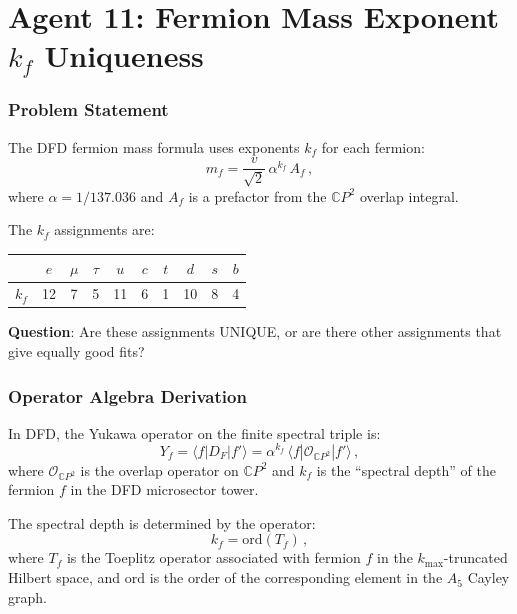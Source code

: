 \documentclass[11pt,a4paper]{article}
\newcommand{\CP}{\mathbb{C}P}
\begin{document}
\part{Agent 11: Fermion Mass Exponent $k_f$ Uniqueness}
\label{part:kf-uniqueness}

\section{Problem Statement}

The DFD fermion mass formula uses exponents $k_f$ for each fermion:
\begin{equation}
m_f = \frac{v}{\sqrt{2}}\,\alpha^{k_f}\,A_f\,,
\end{equation}
where $\alpha = 1/137.036$ and $A_f$ is a prefactor from the $\CP^2$ overlap integral.

The $k_f$ assignments are:

\begin{center}
\begin{tabular}{cccccccccc}
\toprule
& $e$ & $\mu$ & $\tau$ & $u$ & $c$ & $t$ & $d$ & $s$ & $b$ \\
\midrule
$k_f$ & 12 & 7 & 5 & 11 & 6 & 1 & 10 & 8 & 4 \\
\bottomrule
\end{tabular}
\end{center}

\textbf{Question}: Are these assignments UNIQUE, or are there other assignments that give equally good fits?

\section{Operator Algebra Derivation}

In DFD, the Yukawa operator on the finite spectral triple is:
\begin{equation}
Y_f = \langle f | D_F | f' \rangle = \alpha^{k_f}\,\langle f | \mathcal{O}_{\CP^2} | f' \rangle\,,
\end{equation}
where $\mathcal{O}_{\CP^2}$ is the overlap operator on $\CP^2$ and $k_f$ is the ``spectral depth'' of the fermion $f$ in the DFD microsector tower.

The spectral depth is determined by the operator:
\begin{equation}
k_f = \mathrm{ord}(T_f)\,,
\end{equation}
where $T_f$ is the Toeplitz operator associated with fermion $f$ in the $k_{\max}$-truncated Hilbert space, and $\mathrm{ord}$ is the order of the corresponding element in the $A_5$ Cayley graph.
\end{document}
